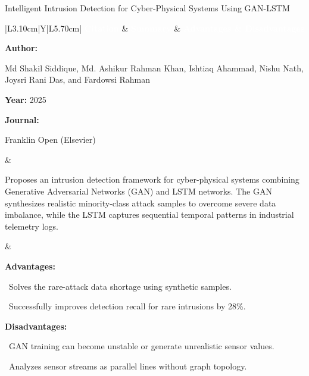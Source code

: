 \documentclass[aspectratio=169,10pt]{beamer}
\newcommand{\lrhdr}{%
  \rowcolor{prismNavy}%
  {\scriptsize\textcolor{white}{\textbf{Citation}}} &
  {\scriptsize\textcolor{white}{\textbf{Summary}}} &
  {\scriptsize\textcolor{white}{\textbf{Advantages \& Disadvantages}}} \\}
\begin{document}
\begin{frame}[t]{Intelligent Intrusion Detection for Cyber-Physical Systems Using GAN-LSTM}
\vspace{-0.30em}
{\footnotesize\setlength{\tabcolsep}{3.5pt}\renewcommand{\arraystretch}{1.10}
\begin{tabularx}{\textwidth}{|L{3.10cm}|Y|L{5.70cm}|}
\hline\lrhdr\hline
\begin{minipage}[t]{\linewidth}\fontsize{7.2pt}{9.2pt}\raggedright\selectfont
\textbf{Author:}\par
Md Shakil Siddique, Md. Ashikur Rahman Khan, Ishtiaq Ahammad, Nishu Nath, Joysri Rani Das, and Fardowsi Rahman\par\vspace{4pt}
\textbf{Year:} 2025\par\vspace{4pt}
\textbf{Journal:}\par
Franklin Open (Elsevier)\par\vspace{4pt}
\end{minipage}
&
\begin{minipage}[t]{\linewidth}\fontsize{7.2pt}{9.2pt}\raggedright\selectfont
Proposes an intrusion detection framework for cyber-physical systems combining Generative Adversarial Networks (GAN) and LSTM networks. The GAN synthesizes realistic minority-class attack samples to overcome severe data imbalance, while the LSTM captures sequential temporal patterns in industrial telemetry logs.\par\vspace{4pt}
\end{minipage}
&
\begin{minipage}[t]{\linewidth}\fontsize{7.2pt}{9.0pt}\raggedright\selectfont
\textcolor{strengthGreen}{\textbf{Advantages:}}\par\vspace{1.5pt}
\textbullet~Solves the rare-attack data shortage using synthetic samples.\par\vspace{2.0pt}\textbullet~Successfully improves detection recall for rare intrusions by 28\%.\par\vspace{4.0pt}
\textcolor{limitRed}{\textbf{Disadvantages:}}\par\vspace{1.5pt}
\textbullet~GAN training can become unstable or generate unrealistic sensor values.\par\vspace{2.0pt}\textbullet~Analyzes sensor streams as parallel lines without graph topology.\par\vspace{4pt}
\end{minipage} \\\hline
\end{tabularx}}
\end{frame}
\end{document}
